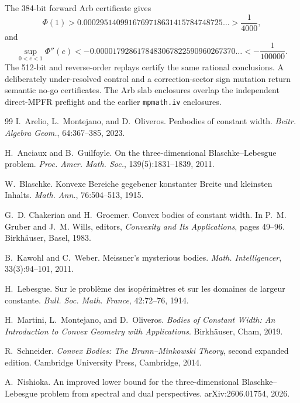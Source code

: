 \documentclass[11pt]{article}
\numberwithin{equation}{section}
\theoremstyle{remark}
\begin{document}
The 384-bit forward Arb certificate gives
\[
  \Phi(1)>
  0.0002951409916769718631415784748725\ldots
  >\frac1{4000},
\]
and
\[
  \sup_{0<e<1}\Phi''(e)
  <-0.0000179286178483067822590960267370\ldots
  <-\frac1{100000}.
\]
The 512-bit and reverse-order replays certify the same rational conclusions.  A deliberately under-resolved control and a correction-sector sign mutation return semantic no-go certificates.  The Arb slab enclosures overlap the independent direct-MPFR preflight and the earlier \texttt{mpmath.iv} enclosures.

\begin{thebibliography}{99}
I.~Arelio, L.~Montejano, and D.~Oliveros.
\newblock Peabodies of constant width.
\newblock \emph{Beitr. Algebra Geom.}, 64:367--385, 2023.

H.~Anciaux and B.~Guilfoyle.
\newblock On the three-dimensional Blaschke--Lebesgue problem.
\newblock \emph{Proc. Amer. Math. Soc.}, 139(5):1831--1839, 2011.

W.~Blaschke.
\newblock Konvexe Bereiche gegebener konstanter Breite und kleinsten Inhalts.
\newblock \emph{Math. Ann.}, 76:504--513, 1915.

G.~D. Chakerian and H.~Groemer.
\newblock Convex bodies of constant width.
\newblock In P.~M. Gruber and J.~M. Wills, editors, \emph{Convexity and Its Applications}, pages 49--96. Birkh\"auser, Basel, 1983.

B.~Kawohl and C.~Weber.
\newblock Meissner's mysterious bodies.
\newblock \emph{Math. Intelligencer}, 33(3):94--101, 2011.

H.~Lebesgue.
\newblock Sur le probl\`eme des isop\'erim\`etres et sur les domaines de largeur constante.
\newblock \emph{Bull. Soc. Math. France}, 42:72--76, 1914.

H.~Martini, L.~Montejano, and D.~Oliveros.
\newblock \emph{Bodies of Constant Width: An Introduction to Convex Geometry with Applications}.
\newblock Birkh\"auser, Cham, 2019.


R.~Schneider.
\newblock \emph{Convex Bodies: The Brunn--Minkowski Theory}, second expanded edition.
\newblock Cambridge University Press, Cambridge, 2014.

A.~Nishioka.
\newblock An improved lower bound for the three-dimensional Blaschke--Lebesgue problem from spectral and dual perspectives.
\newblock arXiv:2606.01754, 2026.
\end{thebibliography}
\end{document}
